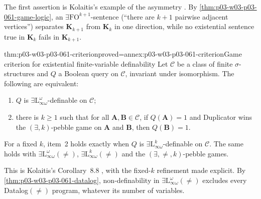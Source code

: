 The first assertion is Kolaitis's example of the asymmetry
\cite[p.~72]{Kolaitis2003ExpressivePowerNotes}. By
\cref{thm:p03-w03-p03-061-game-logic}, an
\(\exists\mathrm{FO}^{k+1}\)-sentence (``there are \(k+1\) pairwise adjacent
vertices'') separates \(\mathbf K_{k+1}\) from \(\mathbf K_k\) in one
direction, while no existential sentence true in \(\mathbf K_k\) fails in
\(\mathbf K_{k+1}\).

\begin{hbtheorem}{thm:p03-w03-p03-061-criterion}{proved=annex:p03-w03-p03-061-criterion}{Game criterion for existential finite-variable definability}
Let \(\mathcal C\) be a class of finite \(\sigma\)-structures and \(Q\) a
Boolean query on \(\mathcal C\), invariant under isomorphism. The following
are equivalent:
\begin{enumerate}
\item \(Q\) is \(\exists\mathrm L^\omega_{\infty\omega}\)-definable on
      \(\mathcal C\);
\item there is \(k\ge1\) such that for all \(\mathbf A,\mathbf B\in\mathcal
      C\), if \(Q(\mathbf A)=1\) and Duplicator wins the
      \((\exists,k)\)-pebble game on \(\mathbf A\) and \(\mathbf B\), then
      \(Q(\mathbf B)=1\).
\end{enumerate}
For a fixed \(k\), item~2 holds exactly when \(Q\) is
\(\exists\mathrm L^k_{\infty\omega}\)-definable on \(\mathcal C\). The same
holds with \(\exists\mathrm L^\omega_{\infty\omega}(\neq)\),
\(\exists\mathrm L^k_{\infty\omega}(\neq)\) and the
\((\exists,\neq,k)\)-pebble games.
\end{hbtheorem}

This is Kolaitis's Corollary~8.8 \cite[Cor.~8.8, p.~73]{Kolaitis2003ExpressivePowerNotes},
with the fixed-\(k\) refinement made explicit. By
\cref{thm:p03-w03-p03-061-datalog}, non-definability in
\(\exists\mathrm L^\omega_{\infty\omega}(\neq)\) excludes every
Datalog\((\neq)\) program, whatever its number of variables.

